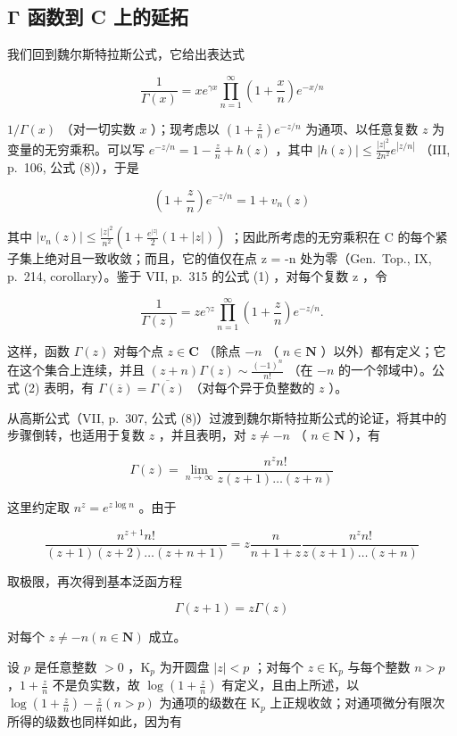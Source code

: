 \subsection{Γ 函数到 C 上的延拓}

我们回到魏尔斯特拉斯公式，它给出表达式

\[
\frac {1}{\Gamma (x)} = x e ^ {\gamma x} \prod_ {n = 1} ^ {\infty} \left(1 + \frac {x}{n}\right) e ^ {- x / n}\tag{1}
\]

\(1 / \Gamma (x)\) （对一切实数 \(x\) ）；现考虑以 \(\left(1 + \frac{z}{n}\right)e^{-z / n}\) 为通项、以任意复数 \(z\) 为变量的无穷乘积。可以写 \(e^{-z / n} = 1 - \frac{z}{n} + h(z)\) ，其中 \(|h(z)| \leqslant \frac{|z|^2}{2n^2} e^{|z / n|}\) （III, p.~106, 公式 (8)），于是

\[
\left(1 + \frac {z}{n}\right) e ^ {- z / n} = 1 + v _ {n} (z)
\]

其中 \(|v_{n}(z)| \leqslant \frac{|z|^{2}}{n^{2}}\left(1 + \frac{e^{|z|}}{2}(1 + |z|)\right)\) ；因此所考虑的无穷乘积在 C 的每个紧子集上绝对且一致收敛；而且，它的值仅在点 z = -n 处为零（Gen.~Top., IX, p.~214, corollary）。鉴于 VII, p.~315 的公式 (1) ，对每个复数 z ，令

\[
\frac {1}{\Gamma (z)} = z e ^ {\gamma z} \prod_ {n = 1} ^ {\infty} \left(1 + \frac {z}{n}\right) e ^ {- z / n}.\tag{2}
\]

这样，函数 \(\Gamma(z)\) 对每个点 \(z \in \mathbf{C}\) （除点 \(-n\) （ \(n \in \mathbf{N}\) ）以外）都有定义；它在这个集合上连续，并且 \((z + n)\Gamma(z) \sim \frac{(-1)^n}{n!}\) （在 \(-n\) 的一个邻域中）。公式 (2) 表明，有 \(\Gamma(\overline{z}) = \overline{\Gamma(z)}\) （对每个异于负整数的 \(z\) ）。

从高斯公式（VII, p.~307, 公式 (8)）过渡到魏尔斯特拉斯公式的论证，将其中的步骤倒转，也适用于复数 \(z\) ，并且表明，对 \(z \neq -n\) （ \(n \in \mathbf{N}\) ），有

\[
\Gamma (z) = \lim _ {n \rightarrow \infty} \frac {n ^ {z} n !}{z (z + 1) \dots (z + n)}\tag{3}
\]

这里约定取 \(n^z = e^{z\log n}\) 。由于

\[
\frac {n ^ {z + 1} n !}{(z + 1) (z + 2) \dots (z + n + 1)} = z \frac {n}{n + 1 + z} \frac {n ^ {z} n !}{z (z + 1) \dots (z + n)}
\]

取极限，再次得到基本泛函方程

\[
\Gamma (z + 1) = z \Gamma (z)\tag{4}
\]

对每个 \(z \neq -n (n \in \mathbf{N})\) 成立。

设 \(p\) 是任意整数 \(> 0\) ，\(\mathrm{K}_p\) 为开圆盘 \(|z| < p\) ；对每个 \(z \in \mathrm{K}_p\) 与每个整数 \(n > p\) ，\(1 + \frac{z}{n}\) 不是负实数，故 \(\log \left(1 + \frac{z}{n}\right)\) 有定义，且由上所述，以 \(\log \left(1 + \frac{z}{n}\right) - \frac{z}{n} (n > p)\) 为通项的级数在 \(\mathrm{K}_p\) 上正规收敛；对通项微分有限次所得的级数也同样如此，因为有

